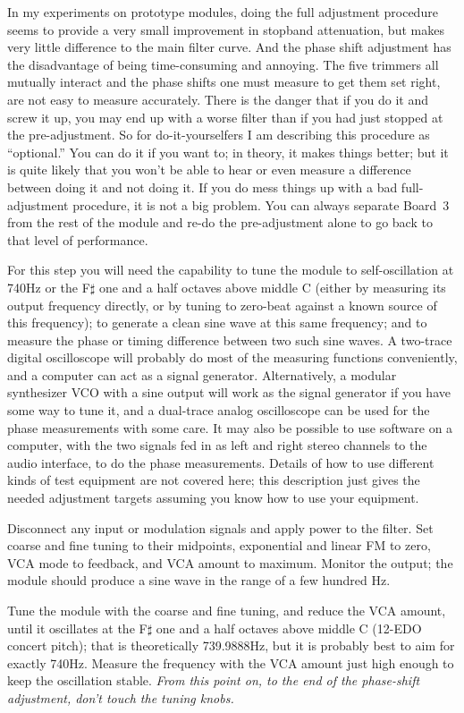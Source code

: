 In my experiments on prototype modules, doing the full adjustment procedure
seems to provide a very small improvement in stopband attenuation, but makes
very little difference to the main filter curve.  And the phase shift
adjustment has the disadvantage of being time-consuming and annoying.  The
five trimmers all mutually interact and the phase shifts one must measure to
get them set right, are not easy to measure accurately.  There is the danger
that if you do it and screw it up, you may end up with a worse filter than
if you had just stopped at the pre-adjustment.  So for do-it-yourselfers I
am describing this procedure as ``optional.'' You can do it if you want to;
in theory, it makes things better; but it is quite likely that you won't be
able to hear or even measure a difference between doing it and not doing it. 
If you do mess things up with a bad full-adjustment procedure, it is not a
big problem.  You can always separate Board~3 from the rest of the module
and re-do the pre-adjustment alone to go back to that level of performance.

For this step you will need the capability to tune the module to
self-oscillation at 740Hz or the F$\sharp$ one and a half octaves above
middle C (either by measuring its output frequency directly, or by tuning to
zero-beat against a known source of this frequency); to generate a clean
sine wave at this same frequency; and to measure the phase or timing
difference between two such sine waves.  A two-trace digital oscilloscope
will probably do most of the measuring functions conveniently, and a
computer can act as a signal generator.  Alternatively, a modular
synthesizer VCO with a sine output will work as the signal generator if you
have some way to tune it, and a dual-trace analog oscilloscope can be used
for the phase measurements with some care.  It may also be possible to use
software on a computer, with the two signals fed in as left and right stereo
channels to the audio interface, to do the phase measurements.  Details of
how to use different kinds of test equipment are not covered here; this
description just gives the needed adjustment targets assuming you know how
to use your equipment.

Disconnect any input or modulation signals and apply power to the filter. 
Set coarse and fine tuning to their midpoints, exponential and linear FM to
zero, VCA mode to feedback, and VCA amount to maximum.  Monitor the output;
the module should produce a sine wave in the range of a few hundred Hz.

Tune the module with the coarse and fine tuning, and reduce the VCA amount,
until it oscillates at the F$\sharp$ one and a half octaves above middle C
(12-EDO concert pitch); that is theoretically 739.9888Hz, but it is probably
best to aim for exactly 740Hz.  Measure the frequency with the VCA amount
just high enough to keep the oscillation stable.  \emph{From this point on,
to the end of the phase-shift adjustment, don't touch the tuning knobs.}


